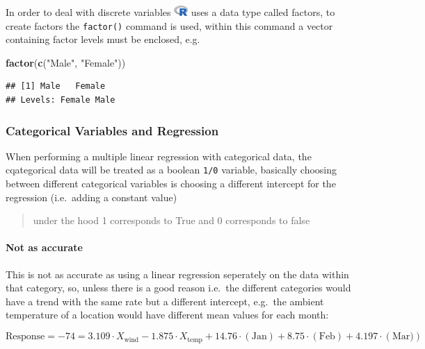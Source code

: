 \documentclass[]{book}
\newenvironment{Shaded}{\begin{snugshade}}{\end{snugshade}}
\newcommand{\KeywordTok}[1]{\textcolor[rgb]{0.13,0.29,0.53}{\textbf{#1}}}
\newcommand{\StringTok}[1]{\textcolor[rgb]{0.31,0.60,0.02}{#1}}
\newcommand{\NormalTok}[1]{#1}
\let\oldparagraph\paragraph
\renewcommand{\paragraph}[1]{\oldparagraph{#1}\mbox{}}
\begin{document}
In order to deal with discrete variables
\includegraphics{images/Ricon20px.png} uses a data type called factors,
to create factors the \texttt{factor()} command is used, within this
command a vector containing factor levels must be enclosed, e.g.

\begin{Shaded}
\begin{Highlighting}[]
\KeywordTok{factor}\NormalTok{(}\KeywordTok{c}\NormalTok{(}\StringTok{"Male"}\NormalTok{, }\StringTok{"Female"}\NormalTok{))}
\end{Highlighting}
\end{Shaded}

\begin{verbatim}
## [1] Male   Female
## Levels: Female Male
\end{verbatim}

\subsubsection{Categorical Variables and
Regression}\label{categorical-variables-and-regression}

When performing a multiple linear regression with categorical data, the
cqategorical data will be treated as a boolean \texttt{1/0} variable,
basically choosing between different categorical variables is choosing a
different intercept for the regression (i.e.~adding a constant value)

\begin{quote}
under the hood 1 corresponds to True and 0 corresponds to false
\end{quote}

\paragraph{Not as accurate}\label{not-as-accurate}

This is not as accurate as using a linear regression seperately on the
data within that category, so, unless there is a good reason i.e.~the
different categories would have a trend with the same rate but a
different intercept, e.g.~the ambient temperature of a location would
have different mean values for each month:

\[
\text{Response} = -74 = 3.109 \cdot X_{\text{wind}} - 1.875\cdot X_{\text{temp}} + 14.76 \cdot \left( \text{Jan} \right) + 8.75 \cdot \left( \text{Feb} \right) +4.197 \cdot \left( \text{Mar}) \right) 
\]
\end{document}
